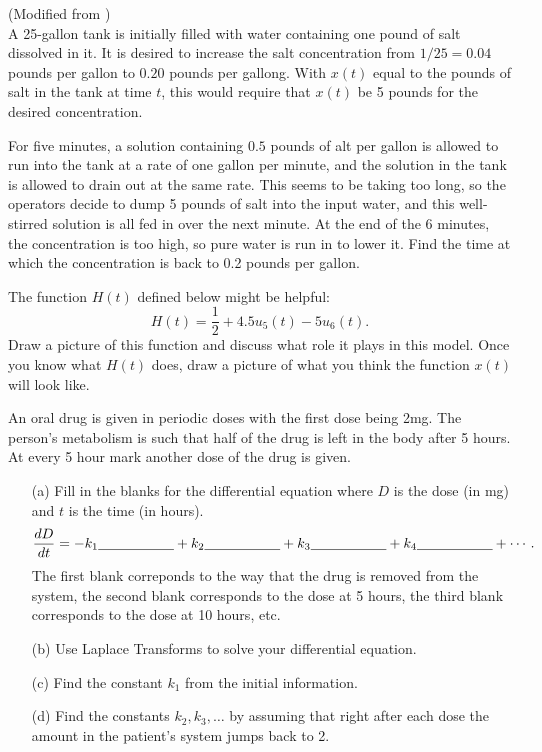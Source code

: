 \begin{problem}
    (Modified from \cite{Noonburg}) \\
    A 25-gallon tank is initially filled with water containing one pound of salt dissolved
    in it.  It is desired to increase the salt concentration from $1/25=0.04$ pounds per gallon
    to $0.20$ pounds per gallong.  With $x(t)$ equal to the pounds of salt in the tank at
    time $t$, this would require that $x(t)$ be 5 pounds for the desired concentration.  

    For five minutes, a solution containing $0.5$ pounds of alt per gallon is allowed to
    run into the tank at a rate of one gallon per minute, and the solution in the tank is
    allowed to drain out at the same rate.  This seems to be taking too long, so the
    operators decide to dump 5 pounds of salt into the input water, and this well-stirred
    solution is all fed in over the next minute.  At the end of the 6 minutes, the
    concentration is too high, so pure water is run in to lower it.  Find the time at
    which the concentration is back to 0.2 pounds per gallon.

    The function $H(t)$ defined below might be helpful:
    \[ H(t) = \frac{1}{2} + 4.5 u_5(t) - 5u_6(t). \]
    Draw a picture of this function and discuss what role it plays in this model.  Once
    you know what $H(t)$ does, draw a picture of what you think the function $x(t)$ will
    look like.
\end{problem}


\begin{problem}\label{prob:laplace_drug}
    An oral drug is given in periodic doses with the first dose being 2mg.  The person's
        metabolism is such that half of the drug is left in the body after 5 hours.  At every 5
        hour mark another dose of the drug is given.  
        \begin{enumerate}
            \item[(a)] Fill in the blanks for the differential equation where $D$ is the dose (in mg)
                and $t$ is the time (in hours).
                \[ \frac{dD}{dt} = -k_1 \underline{\hspace{0.75in}} + k_2 \underline{\hspace{0.75in}}
                + k_3 \underline{\hspace{0.75in}} + k_4 \underline{\hspace{0.75in}} + \cdots. \]
                The first blank correponds to the way that the drug is removed from the
                system, the second blank
                corresponds to the dose at 5 hours, the third blank corresponds to the
                dose at 10 hours, etc.
            \item[(b)] Use Laplace Transforms to solve your differential equation.
            \item[(c)] Find the constant $k_1$ from the initial information.  
            \item[(d)] Find the constants $k_2, k_3, \dots$ by assuming that right after each
                dose the amount in the patient's system jumps back to 2.
        \end{enumerate}
\end{problem}


